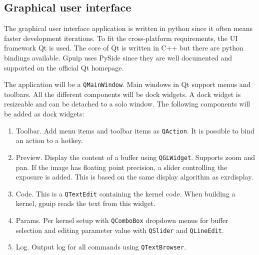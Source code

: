 \subsection{Graphical user interface}

The graphical user interface application is written in python since it often means faster development iterations. To fit the cross-platform requirements, the UI framework Qt\cite{qt} is used. The core of Qt is written in C++ but there are python bindings available. Gpuip uses PySide\cite{pyside} since they are well documented and supported on the official Qt homepage. 
\newline

The application will be a {\tt QMainWindow}. Main windows in Qt support menus and toolbars. All the different components will be dock widgets. A dock widget is resizeable and can be detached to a solo window. The following components will be added as dock widgets:

\begin{enumerate}
\item Toolbar. Add menu items and toolbar items as {\tt QAction}. It is possible to bind an action to a hotkey.
\item Preview. Display the content of a buffer using {\tt QGLWidget}. Supports zoom and pan. If the image has floating point precision, a slider controlling the exposure is added. This is based on the same display algorithm as exrdisplay\cite{exrdisplay}.
\item Code. This is a {\tt QTextEdit} containing the kernel code. When building a kernel, gpuip reads the text from this widget.
\item Params. Per kernel setup with {\tt QComboBox} dropdown menus for buffer selection and editing parameter value with {\tt QSlider} and {\tt QLineEdit}.
\item Log. Output log for all commands using {\tt QTextBrowser}.
\end{enumerate}
